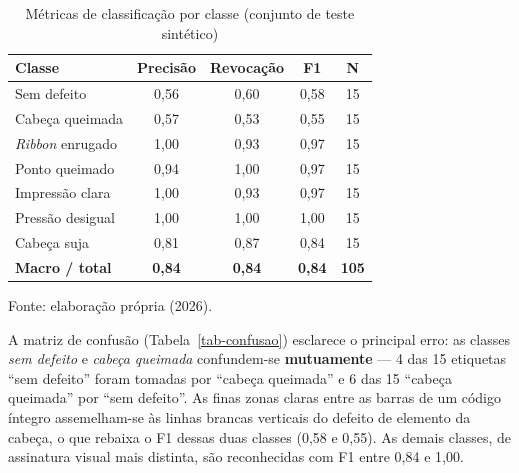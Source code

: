 \documentclass[
	article,			%
	11pt,				%
	oneside,			%
	a4paper,			%
	english,			%
	brazilian,			%
	sumario=tradicional
	]{abntex2}
\begin{document}
\begin{table}[htb]
\centering
\caption{Métricas de classificação por classe (conjunto de teste sintético)}
\label{tab-metricas}
\begin{tabular}{@{}lcccc@{}}
\toprule
\textbf{Classe} & \textbf{Precisão} & \textbf{Revocação} & \textbf{F1} & \textbf{N}\\
\midrule
Sem defeito & 0,56 & 0,60 & 0,58 & 15\\
Cabeça queimada & 0,57 & 0,53 & 0,55 & 15\\
\textit{Ribbon} enrugado & 1,00 & 0,93 & 0,97 & 15\\
Ponto queimado & 0,94 & 1,00 & 0,97 & 15\\
Impressão clara & 1,00 & 0,93 & 0,97 & 15\\
Pressão desigual & 1,00 & 1,00 & 1,00 & 15\\
Cabeça suja & 0,81 & 0,87 & 0,84 & 15\\
\midrule
\textbf{Macro / total} & \textbf{0,84} & \textbf{0,84} & \textbf{0,84} & \textbf{105}\\
\bottomrule
\end{tabular}

\vspace{2pt}
{\footnotesize Fonte: elaboração própria (2026).}
\end{table}

A matriz de confusão (Tabela~\ref{tab-confusao}) esclarece o principal erro: as classes
\emph{sem defeito} e \emph{cabeça queimada} confundem-se \textbf{mutuamente} --- 4 das
15 etiquetas ``sem defeito'' foram tomadas por ``cabeça queimada'' e 6 das 15 ``cabeça
queimada'' por ``sem defeito''. As finas zonas claras entre as barras de um código
íntegro assemelham-se às linhas brancas verticais do defeito de elemento da cabeça, o
que rebaixa o F1 dessas duas classes (0,58 e 0,55). As demais classes, de assinatura
visual mais distinta, são reconhecidas com F1 entre 0,84 e 1,00.
\end{document}
